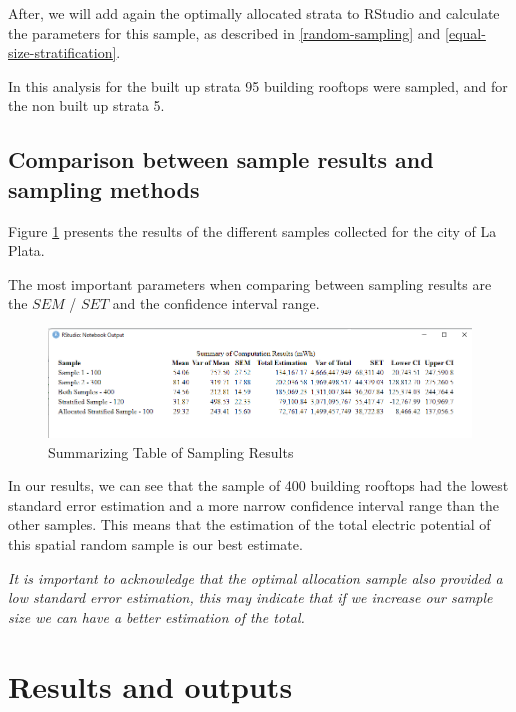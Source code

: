 \documentclass[
]{book}
\begin{document}
After, we will add again the optimally allocated strata to RStudio and calculate the parameters for this sample, as described in \ref{random-sampling} and \ref{equal-size-stratification}.

In this analysis for the built up strata 95 building rooftops were sampled, and for the non built up strata 5.

\hypertarget{comparison-between-sample-results-and-sampling-methods}{%
\section{Comparison between sample results and sampling methods}\label{comparison-between-sample-results-and-sampling-methods}}

Figure \ref{fig:img-228} presents the results of the different samples collected for the city of La Plata.

The most important parameters when comparing between sampling results are the \(SEM\) / \(SET\) and the confidence interval range.

\begin{figure}

{\centering \includegraphics[width=1\linewidth]{images/sumtab} 

}

\caption{Summarizing Table of Sampling Results}\label{fig:img-228}
\end{figure}

In our results, we can see that the sample of 400 building rooftops had the lowest standard error estimation and a more narrow confidence interval range than the other samples.
This means that the estimation of the total electric potential of this spatial random sample is our best estimate.

\emph{It is important to acknowledge that the optimal allocation sample also provided a low standard error estimation, this may indicate that if we increase our sample size we can have a better estimation of the total.}

\hypertarget{results-and-outputs}{%
\chapter{Results and outputs}\label{results-and-outputs}}
\end{document}
